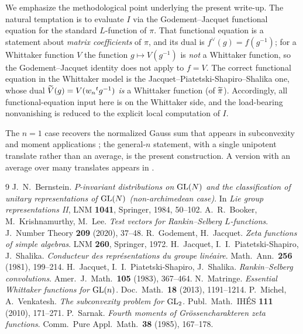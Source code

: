 We emphasize the methodological point underlying the present write-up. The natural temptation is
to evaluate $I$ via the Godement--Jacquet functional equation for the standard $L$-function of
$\pi$. That functional equation is a statement about \emph{matrix coefficients} of $\pi$, and its
dual is $f^\vee(g)=f(g^{-1})$; for a Whittaker function $V$ the function $g\mapsto V(g^{-1})$ is
\emph{not} a Whittaker function, so the Godement--Jacquet identity does not apply to $f=V$. The
correct functional equation in the Whittaker model is the Jacquet--Piatetski-Shapiro--Shalika one,
whose dual $\widetilde{V}(g)=V(w_n{}^{t}g^{-1})$ \emph{is} a Whittaker function \textup{(}of
$\widetilde{\pi}$\textup{)}. Accordingly, all functional-equation input here is on the Whittaker
side, and the load-bearing nonvanishing is reduced to the explicit local computation of $I$.

The $n=1$ case recovers the normalized Gauss sum that appears in subconvexity and moment
applications \cite{Sarnak,MV}; the general-$n$ statement, with a single unipotent translate rather
than an average, is the present construction. A version with an average over many translates
appears in \cite{BKL}.

\begin{thebibliography}{9}
 J.~N.~Bernstein.
  \emph{$P$-invariant distributions on $\mathrm{GL}(N)$ and the classification of
  unitary representations of $\mathrm{GL}(N)$ (non-archimedean case)}. In
  \emph{Lie group representations II}, LNM \textbf{1041}, Springer, 1984,
  50--102.
 A.~R.~Booker, M.~Krishnamurthy, M.~Lee.
  \emph{Test vectors for Rankin--Selberg $L$-functions}.
  J.\ Number Theory \textbf{209} (2020), 37--48.
 R.~Godement, H.~Jacquet.
  \emph{Zeta functions of simple algebras}. LNM \textbf{260}, Springer, 1972.
 H.~Jacquet, I.~I.~Piatetski-Shapiro, J.~Shalika.
  \emph{Conducteur des repr\'esentations du groupe lin\'eaire}.
  Math.\ Ann.\ \textbf{256} (1981), 199--214.
 H.~Jacquet, I.~I.~Piatetski-Shapiro, J.~Shalika.
  \emph{Rankin--Selberg convolutions}.
  Amer.\ J.\ Math.\ \textbf{105} (1983), 367--464.
 N.~Matringe.
  \emph{Essential Whittaker functions for $\mathrm{GL}(n)$}.
  Doc.\ Math.\ \textbf{18} (2013), 1191--1214.
 P.~Michel, A.~Venkatesh.
  \emph{The subconvexity problem for $\mathrm{GL}_2$}.
  Publ.\ Math.\ IH\'ES \textbf{111} (2010), 171--271.
 P.~Sarnak.
  \emph{Fourth moments of Gr\"ossencharakteren zeta functions}.
  Comm.\ Pure Appl.\ Math.\ \textbf{38} (1985), 167--178.
\end{thebibliography}

\endgroup

\endgroup
